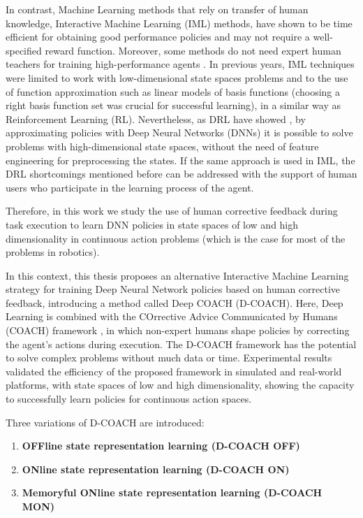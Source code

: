 In contrast, Machine Learning methods that rely on transfer of human knowledge, Interactive Machine Learning (IML) methods, have shown to be time efficient for obtaining good performance policies and may not require a well-specified reward function. Moreover, some methods do not need expert human teachers for training high-performance agents \cite{akrour2011preference,Knox:2009:ISA:1597735.1597738,Celemin2018AnInteractive}. In previous years, IML techniques were limited to work with low-dimensional state spaces problems and to the use of function approximation such as linear models of basis functions (choosing a right basis function set was crucial for successful learning), in a similar way as Reinforcement Learning (RL). Nevertheless, as DRL have showed \cite{Mnih2015, Lillicrap2015}, by approximating policies with Deep Neural Networks (DNNs) it is possible to solve problems with high-dimensional state spaces, without the need of feature engineering for preprocessing the states. If the same approach is used in IML, the DRL shortcomings mentioned before can be addressed with the support of human users who participate in the learning process of the agent.

Therefore, in this work we study the use of human corrective feedback during task execution to learn DNN policies in state spaces of low and high dimensionality in continuous action problems (which is the case for most of the problems in robotics).

In this context, this thesis proposes an alternative Interactive Machine Learning strategy for training Deep Neural Network policies based on human corrective feedback, introducing a method called Deep COACH (D-COACH). Here, Deep Learning is combined with the COrrective Advice Communicated by Humans (COACH) framework \cite{Celemin2018AnInteractive}, in which non-expert humans shape policies by correcting the agent’s actions during execution. The D-COACH framework has the potential to solve complex problems without much data or time. Experimental results validated the efficiency of the proposed framework in simulated and real-world platforms, with state spaces of low and high dimensionality, showing the capacity to successfully learn policies for continuous action spaces. 

Three variations of D-COACH are introduced:

\begin{enumerate}
    \item \textbf{OFFline state representation learning (D-COACH OFF)}
    \item \textbf{ONline state representation learning (D-COACH ON)}
    \item \textbf{Memoryful ONline state representation learning (D-COACH MON)}
\end{enumerate}

